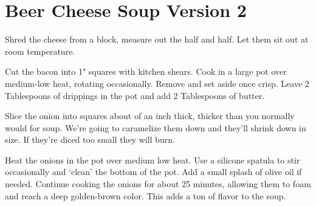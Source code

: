 \section{Beer Cheese Soup Version 2}
\begin{recipe}




Shred the cheese from a block, measure out the half and half. Let them sit out at room temperature.

Cut the bacon into 1" squares with kitchen shears. Cook in a large pot over medium-low heat, rotating occasionally. Remove and set aside once crisp. Leave 2 Tablespoons of drippings in the pot and add 2 Tablespoons of butter.

Slice the onion into squares about  of an inch thick, thicker than you normally would for soup. We’re going to caramelize them down and they’ll shrink down in size. If they’re diced too small they will burn.

Heat the onions in the pot over medium low heat. Use a silicone spatula to stir occasionally and ‘clean’ the bottom of the pot. Add a small splash of olive oil if needed. Continue cooking the onions for about 25 minutes, allowing them to foam and reach a deep golden-brown color. This adds a ton of flavor to the soup.


\end{recipe}
